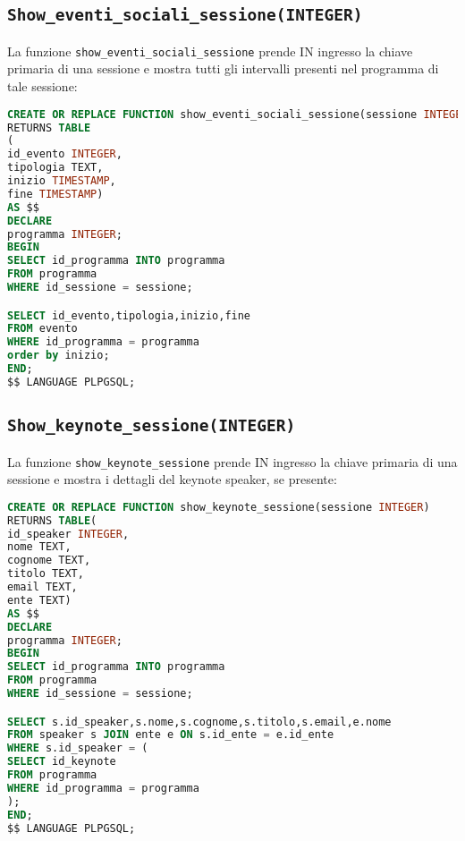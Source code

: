 \subsection{\texttt{Show\_eventi\_sociali\_sessione(INTEGER)}}
La funzione \texttt{show\_eventi\_sociali\_sessione} prende IN ingresso la chiave primaria di una sessione e mostra tutti gli intervalli presenti nel programma di tale sessione:
\begin{lstlisting}[language=SQL,style=mystyle]
CREATE OR REPLACE FUNCTION show_eventi_sociali_sessione(sessione INTEGER)
RETURNS TABLE
(
id_evento INTEGER,
tipologia TEXT,
inizio TIMESTAMP,
fine TIMESTAMP) 
AS $$
DECLARE 
programma INTEGER;
BEGIN
SELECT id_programma INTO programma
FROM programma
WHERE id_sessione = sessione;

SELECT id_evento,tipologia,inizio,fine
FROM evento
WHERE id_programma = programma
order by inizio;
END;
$$ LANGUAGE PLPGSQL;
\end{lstlisting}
\subsection{\texttt{Show\_keynote\_sessione(INTEGER)}}
La funzione \texttt{show\_keynote\_sessione} prende IN ingresso la chiave primaria di una sessione e mostra i dettagli del keynote speaker, se presente:
\begin{lstlisting}[language=SQL,style=mystyle]
CREATE OR REPLACE FUNCTION show_keynote_sessione(sessione INTEGER)
RETURNS TABLE(
id_speaker INTEGER,
nome TEXT,
cognome TEXT,
titolo TEXT,
email TEXT,
ente TEXT) 
AS $$
DECLARE 
programma INTEGER;
BEGIN
SELECT id_programma INTO programma
FROM programma
WHERE id_sessione = sessione;

SELECT s.id_speaker,s.nome,s.cognome,s.titolo,s.email,e.nome
FROM speaker s JOIN ente e ON s.id_ente = e.id_ente
WHERE s.id_speaker = (
SELECT id_keynote
FROM programma
WHERE id_programma = programma
);
END;
$$ LANGUAGE PLPGSQL;
\end{lstlisting}
